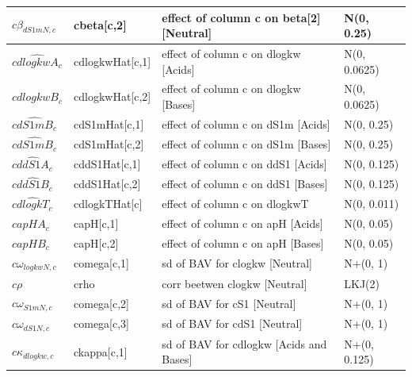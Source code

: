 \documentclass[
]{article}
\begin{document}
\begin{longtable}[t]{l|l|l|l}
\hline
\hspace{1em}$c\beta_{dS1mN,c}$ & cbeta[c,2] & effect of column c on beta[2] [Neutral] & N(0, 0.25)\\
\hline
\hspace{1em}$\hat{cdlogkwA_{c}}$ & cdlogkwHat[c,1] & effect of column c on dlogkw [Acids] & N(0, 0.0625)\\
\hline
\hspace{1em}$\hat{cdlogkwB_{c}}$ & cdlogkwHat[c,2] & effect of column c on dlogkw [Bases] & N(0, 0.0625)\\
\hline
\hspace{1em}$\hat{cdS1mB_{c}}$ & cdS1mHat[c,1] & effect of column c on dS1m [Acids] & N(0, 0.25)\\
\hline
\hspace{1em}$\hat{cdS1mB_{c}}$ & cdS1mHat[c,2] & effect of column c on dS1m [Bases] & N(0, 0.25)\\
\hline
\hspace{1em}$\hat{cddS1A_{c}}$ & cddS1Hat[c,1] & effect of column c on ddS1 [Acids] & N(0, 0.125)\\
\hline
\hspace{1em}$\hat{cddS1B_{c}}$ & cddS1Hat[c,2] & effect of column c on ddS1 [Bases] & N(0, 0.125)\\
\hline
\hspace{1em}$\hat{cdlogkT_c}$ & cdlogkTHat[c] & effect of column c on dlogkwT & N(0, 0.011)\\
\hline
\hspace{1em}$capHA_{c}$ & capH[c,1] & effect of column c on apH [Acids] & N(0, 0.05)\\
\hline
\hspace{1em}$capHB_{c}$ & capH[c,2] & effect of column c on apH [Bases] & N(0, 0.05)\\
\hline
\hspace{1em}$c\omega_{logkwN,c}$ & comega[c,1] & sd of BAV for clogkw [Neutral] & N+(0, 1)\\
\hline
\hspace{1em}$c\rho$ & crho & corr beetwen clogkw [Neutral] & LKJ(2)\\
\hline
\hspace{1em}$c\omega_{S1mN,c}$ & comega[c,2] & sd of BAV for cS1 [Neutral] & N+(0, 1)\\
\hline
\hspace{1em}$c\omega_{dS1N,c}$ & comega[c,3] & sd of BAV for cdS1 [Neutral] & N+(0, 1)\\
\hline
\hspace{1em}$c\kappa_{dlogkw,c}$ & ckappa[c,1] & sd of BAV for cdlogkw [Acids and Bases] & N+(0, 0.125)\\

\end{longtable}
\end{document}
